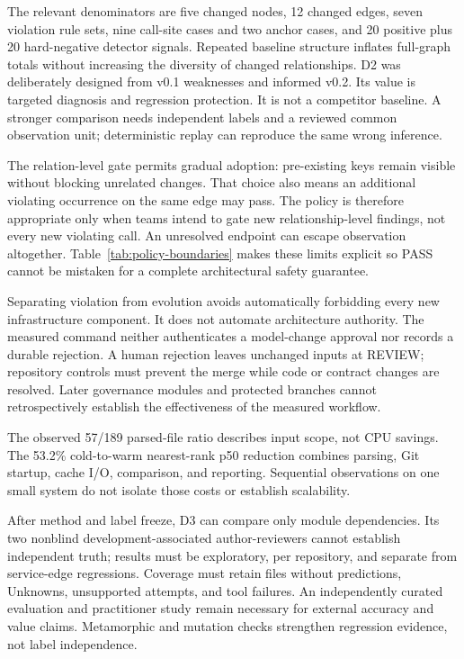 \documentclass[conference]{IEEEtran}
\begin{document}
The relevant denominators are five changed nodes, 12 changed edges, seven violation rule sets, nine call-site cases and two anchor cases, and 20 positive plus 20 hard-negative detector signals. Repeated baseline structure inflates full-graph totals without increasing the diversity of changed relationships. D2 was deliberately designed from v0.1 weaknesses and informed v0.2. Its value is targeted diagnosis and regression protection. It is not a competitor baseline. A stronger comparison needs independent labels and a reviewed common observation unit; deterministic replay can reproduce the same wrong inference.

The relation-level gate permits gradual adoption: pre-existing keys remain visible without blocking unrelated changes. That choice also means an additional violating occurrence on the same edge may pass. The policy is therefore appropriate only when teams intend to gate new relationship-level findings, not every new violating call. An unresolved endpoint can escape observation altogether. Table~\ref{tab:policy-boundaries} makes these limits explicit so PASS cannot be mistaken for a complete architectural safety guarantee.

Separating violation from evolution avoids automatically forbidding every new infrastructure component. It does not automate architecture authority. The measured command neither authenticates a model-change approval nor records a durable rejection. A human rejection leaves unchanged inputs at REVIEW; repository controls must prevent the merge while code or contract changes are resolved. Later governance modules and protected branches cannot retrospectively establish the effectiveness of the measured workflow.

The observed 57/189 parsed-file ratio describes input scope, not CPU savings. The 53.2\% cold-to-warm nearest-rank p50 reduction combines parsing, Git startup, cache I/O, comparison, and reporting. Sequential observations on one small system do not isolate those costs or establish scalability.

After method and label freeze, D3 can compare only module dependencies. Its two nonblind development-associated author-reviewers cannot establish independent truth; results must be exploratory, per repository, and separate from service-edge regressions. Coverage must retain files without predictions, Unknowns, unsupported attempts, and tool failures. An independently curated evaluation and practitioner study remain necessary for external accuracy and value claims. Metamorphic and mutation checks strengthen regression evidence, not label independence.
\end{document}

